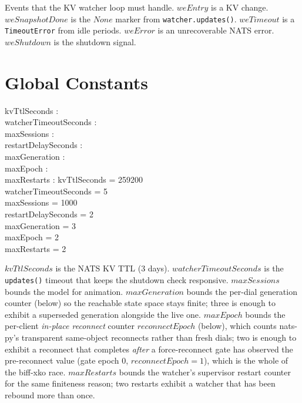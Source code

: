 \documentclass[a4paper,10pt,fleqn]{article}
\begin{document}
Events that the KV watcher loop must handle.  $weEntry$ is a KV
change.  $weSnapshotDone$ is the $None$ marker from
\texttt{watcher.updates()}.  $weTimeout$ is a
\texttt{TimeoutError} from idle periods.  $weError$ is an
unrecoverable NATS error.  $weShutdown$ is the shutdown signal.

\section{Global Constants}

\begin{axdef}
  kvTtlSeconds : \nat \\
  watcherTimeoutSeconds : \nat \\
  maxSessions : \nat \\
  restartDelaySeconds : \nat \\
  maxGeneration : \nat \\
  maxEpoch : \nat \\
  maxRestarts : \nat
  \where
  kvTtlSeconds = 259200 \\
  watcherTimeoutSeconds = 5 \\
  maxSessions = 1000 \\
  restartDelaySeconds = 2 \\
  maxGeneration = 3 \\
  maxEpoch = 2 \\
  maxRestarts = 2
\end{axdef}

$kvTtlSeconds$ is the NATS KV TTL (3 days).
$watcherTimeoutSeconds$ is the \texttt{updates()} timeout that
keeps the shutdown check responsive.  $maxSessions$ bounds the
model for animation.  $maxGeneration$ bounds the per-dial
generation counter (below) so the reachable state space stays
finite; three is enough to exhibit a superseded generation
alongside the live one.  $maxEpoch$ bounds the per-client
\emph{in-place reconnect} counter $reconnectEpoch$ (below), which
counts nats-py's transparent same-object reconnects rather than
fresh dials; two is enough to exhibit a reconnect that completes
\emph{after} a force-reconnect gate has observed the pre-reconnect
value (gate epoch $0$, $reconnectEpoch = 1$), which is the whole
of the biff-xko race.  $maxRestarts$ bounds the watcher's supervisor
restart counter for the same finiteness reason; two restarts exhibit a
watcher that has been rebound more than once.
\end{document}
